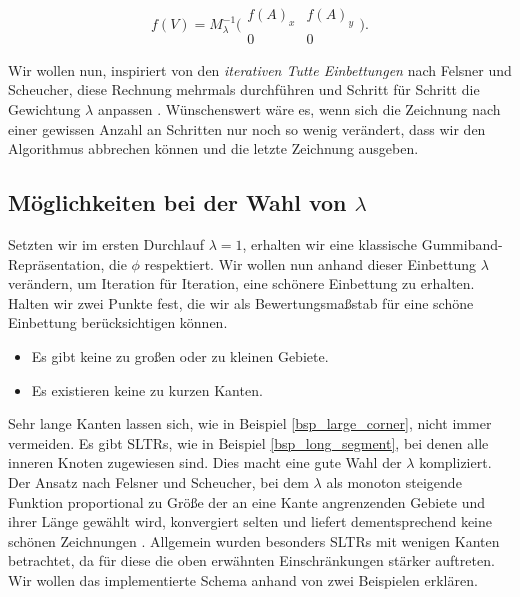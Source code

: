 $$f(V) = M_{\lambda}^{-1}\big( \begin{smallmatrix}f(A)_x&f(A)_y\\ 0&0\end{smallmatrix} \big).$$

Wir wollen nun, inspiriert von den \textit{iterativen Tutte Einbettungen} nach Felsner und Scheucher, diese Rechnung mehrmals durchführen und Schritt für Schritt die Gewichtung $\lambda$ anpassen \cite{fs17}. Wünschenswert wäre es, wenn sich die Zeichnung nach einer gewissen Anzahl an Schritten nur noch so wenig verändert, dass wir den Algorithmus abbrechen können und die letzte Zeichnung ausgeben.

\subsection{Möglichkeiten bei der Wahl von $\lambda$}

Setzten wir im ersten Durchlauf $\lambda = 1$, erhalten wir eine klassische Gummiband-Repräsentation, die $\phi$ respektiert. Wir wollen nun anhand dieser Einbettung $\lambda$ verändern, um Iteration für Iteration, eine \glqq schönere\grqq{ } Einbettung zu erhalten. Halten wir zwei Punkte fest, die wir als Bewertungsmaßstab für eine schöne Einbettung berücksichtigen können.

\begin{itemize}
\item Es gibt keine zu großen oder zu kleinen Gebiete.
\item Es existieren keine zu kurzen Kanten.
\end{itemize}

Sehr lange Kanten lassen sich, wie in Beispiel \ref{bsp_large_corner}, nicht immer vermeiden. Es gibt SLTRs, wie in Beispiel \ref{bsp_long_segment}, bei denen alle inneren Knoten zugewiesen sind. Dies macht eine gute Wahl der $\lambda$ kompliziert. Der Ansatz nach Felsner und Scheucher, bei dem $\lambda$ als monoton steigende Funktion proportional zu Größe der an eine Kante angrenzenden Gebiete und ihrer Länge gewählt wird, konvergiert selten und liefert dementsprechend keine schönen Zeichnungen \cite{fs17}. Allgemein wurden besonders SLTRs mit wenigen Kanten betrachtet, da für diese die oben erwähnten Einschränkungen stärker auftreten. Wir wollen das implementierte  Schema anhand von zwei Beispielen erklären.

